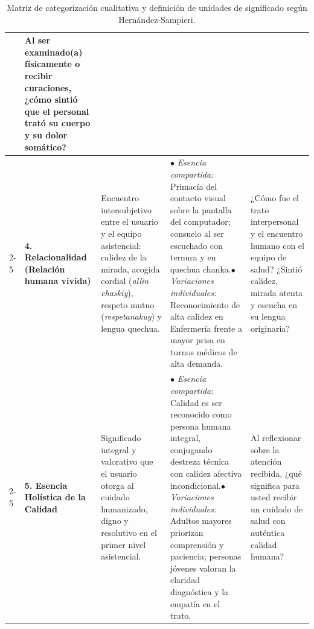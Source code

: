 \begin{table}[H]
\begin{tabularx}{\textwidth}{p{2.3cm}p{2.5cm}p{3.2cm}p{3.8cm}X}
& Al ser examinado(a) físicamente o recibir curaciones, ¿cómo sintió que el personal trató su cuerpo y su dolor somático? \\
\cmidrule{2-5}
& \textbf{4. Relacionalidad (Relación humana vivida)} 
& Encuentro intersubjetivo entre el usuario y el equipo asistencial: calidez de la mirada, acogida cordial (\textit{allin chaskiy}), respeto mutuo (\textit{respetanakuy}) y lengua quechua. 
& $\bullet$ \textit{Esencia compartida:} Primacía del contacto visual sobre la pantalla del computador; consuelo al ser escuchado con ternura y en quechua chanka.\newline $\bullet$ \textit{Variaciones individuales:} Reconocimiento de alta calidez en Enfermería frente a mayor prisa en turnos médicos de alta demanda. 
& ¿Cómo fue el trato interpersonal y el encuentro humano con el equipo de salud? ¿Sintió calidez, mirada atenta y escucha en su lengua originaria? \\
\cmidrule{2-5}
& \textbf{5. Esencia Holística de la Calidad} 
& Significado integral y valorativo que el usuario otorga al cuidado humanizado, digno y resolutivo en el primer nivel asistencial. 
& $\bullet$ \textit{Esencia compartida:} Calidad es ser reconocido como persona humana integral, conjugando destreza técnica con calidez afectiva incondicional.\newline $\bullet$ \textit{Variaciones individuales:} Adultos mayores priorizan comprensión y paciencia; personas jóvenes valoran la claridad diagnóstica y la empatía en el trato. 
& Al reflexionar sobre la atención recibida, ¿qué significa para usted recibir un cuidado de salud con auténtica calidad humana? \\
\bottomrule
\end{tabularx}
\caption{Matriz de categorización cualitativa y definición de unidades de significado según Hernández-Sampieri.}
\label{tab:categorizacion}
\end{table}

\newpage
